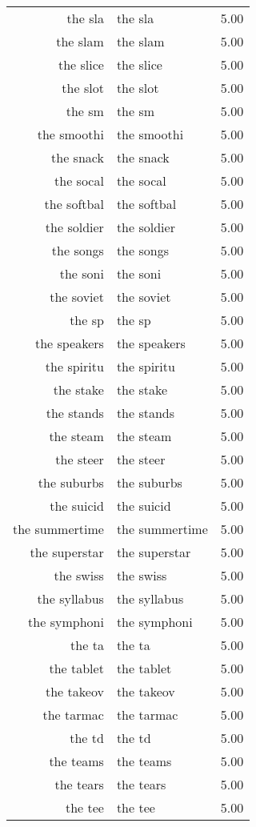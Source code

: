 \begin{table}[ht]
\begin{tabular}{rlr}
  the sla & the sla & 5.00 \\ 
  the slam & the slam & 5.00 \\ 
  the slice & the slice & 5.00 \\ 
  the slot & the slot & 5.00 \\ 
  the sm & the sm & 5.00 \\ 
  the smoothi & the smoothi & 5.00 \\ 
  the snack & the snack & 5.00 \\ 
  the socal & the socal & 5.00 \\ 
  the softbal & the softbal & 5.00 \\ 
  the soldier & the soldier & 5.00 \\ 
  the songs & the songs & 5.00 \\ 
  the soni & the soni & 5.00 \\ 
  the soviet & the soviet & 5.00 \\ 
  the sp & the sp & 5.00 \\ 
  the speakers & the speakers & 5.00 \\ 
  the spiritu & the spiritu & 5.00 \\ 
  the stake & the stake & 5.00 \\ 
  the stands & the stands & 5.00 \\ 
  the steam & the steam & 5.00 \\ 
  the steer & the steer & 5.00 \\ 
  the suburbs & the suburbs & 5.00 \\ 
  the suicid & the suicid & 5.00 \\ 
  the summertime & the summertime & 5.00 \\ 
  the superstar & the superstar & 5.00 \\ 
  the swiss & the swiss & 5.00 \\ 
  the syllabus & the syllabus & 5.00 \\ 
  the symphoni & the symphoni & 5.00 \\ 
  the ta & the ta & 5.00 \\ 
  the tablet & the tablet & 5.00 \\ 
  the takeov & the takeov & 5.00 \\ 
  the tarmac & the tarmac & 5.00 \\ 
  the td & the td & 5.00 \\ 
  the teams & the teams & 5.00 \\ 
  the tears & the tears & 5.00 \\ 
  the tee & the tee & 5.00 \\ 

\end{tabular}
\end{table}
